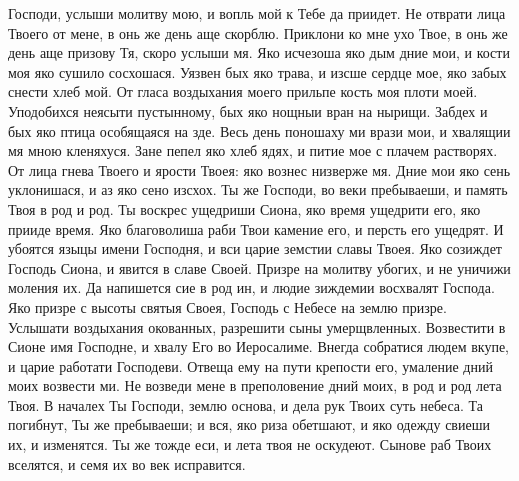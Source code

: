 Господи, услыши молитву мою, и вопль мой к Тебе да приидет. Не отврати лица Твоего от мене, в онь же день аще скорблю. Приклони ко мне ухо Твое, в онь же  день аще призову Тя, скоро услыши мя. Яко исчезоша яко дым дние мои, и кости моя яко сушило сосхошася. Уязвен бых яко трава, и изсше сердце мое, яко забых снести хлеб мой. От гласа воздыхания моего прильпе кость моя плоти моей. Уподобихся неясыти пустынному, бых яко нощныи вран на нырищи. Забдех и бых яко птица особящаяся на зде. Весь день поношаху ми врази мои, и хвалящии мя мною кленяхуся. Зане пепел яко хлеб ядях, и питие мое с плачем растворях. От лица гнева Твоего и ярости Твоея: яко вознес низверже мя. Дние мои яко сень уклонишася, и аз яко сено изсхох. Ты же Господи, во веки пребываеши, и память Твоя в род и род. Ты воскрес ущедриши Сиона, яко время ущедрити его, яко прииде время. Яко благоволиша раби Твои камение его, и персть его ущедрят. И убоятся языцы имени Господня, и вси царие земстии славы Твоея. Яко созиждет Господь Сиона, и явится в славе Своей. Призре на молитву убогих, и не уничижи моления их. Да напишется сие в род ин, и людие зиждемии восхвалят Господа. Яко призре с высоты святыя Своея, Господь с Небесе на землю призре. Услышати воздыхания окованных, разрешити сыны умерщвленных. Возвестити в Сионе имя Господне, и хвалу Его во Иеросалиме. Внегда собратися людем вкупе, и царие  работати Господеви. Отвеща ему на пути крепости его, умаление дний моих возвести ми. Не возведи мене в преполовение дний моих, в род и род лета Твоя. В началех Ты Господи, землю основа, и дела рук Твоих суть небеса. Та погибнут, Ты же пребываеши; и вся, яко риза обетшают, и яко одежду  свиеши их, и изменятся. Ты же тожде еси, и лета твоя не оскудеют. Сынове раб Твоих вселятся, и семя их во век исправится.




